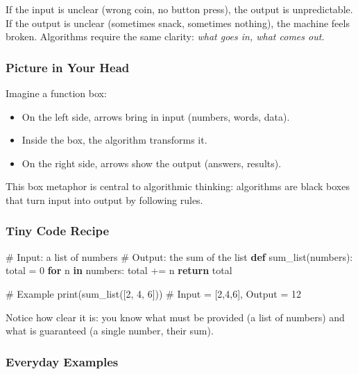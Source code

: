 \documentclass[
  letterpaper,
  DIV=11,
  numbers=noendperiod]{scrreprt}
\newenvironment{Shaded}{\begin{snugshade}}{\end{snugshade}}
\newcommand{\BuiltInTok}[1]{\textcolor[rgb]{0.00,0.23,0.31}{#1}}
\newcommand{\CommentTok}[1]{\textcolor[rgb]{0.37,0.37,0.37}{#1}}
\newcommand{\ControlFlowTok}[1]{\textcolor[rgb]{0.00,0.23,0.31}{\textbf{#1}}}
\newcommand{\DecValTok}[1]{\textcolor[rgb]{0.68,0.00,0.00}{#1}}
\newcommand{\KeywordTok}[1]{\textcolor[rgb]{0.00,0.23,0.31}{\textbf{#1}}}
\newcommand{\NormalTok}[1]{\textcolor[rgb]{0.00,0.23,0.31}{#1}}
\newcommand{\OperatorTok}[1]{\textcolor[rgb]{0.37,0.37,0.37}{#1}}
\providecommand{\tightlist}{%
  \setlength{\itemsep}{0pt}\setlength{\parskip}{0pt}}
\begin{document}
If the input is unclear (wrong coin, no button press), the output is
unpredictable. If the output is unclear (sometimes snack, sometimes
nothing), the machine feels broken. Algorithms require the same clarity:
\emph{what goes in, what comes out.}

\subsubsection{Picture in Your Head}\label{picture-in-your-head-10}

Imagine a function box:

\begin{itemize}
\tightlist
\item
  On the left side, arrows bring in input (numbers, words, data).
\item
  Inside the box, the algorithm transforms it.
\item
  On the right side, arrows show the output (answers, results).
\end{itemize}

This box metaphor is central to algorithmic thinking: algorithms are
black boxes that turn input into output by following rules.

\subsubsection{Tiny Code Recipe}\label{tiny-code-recipe-9}

\begin{Shaded}
\begin{Highlighting}[]
\CommentTok{\# Input: a list of numbers}
\CommentTok{\# Output: the sum of the list}
\KeywordTok{def}\NormalTok{ sum\_list(numbers):}
\NormalTok{    total }\OperatorTok{=} \DecValTok{0}
    \ControlFlowTok{for}\NormalTok{ n }\KeywordTok{in}\NormalTok{ numbers:}
\NormalTok{        total }\OperatorTok{+=}\NormalTok{ n}
    \ControlFlowTok{return}\NormalTok{ total}

\CommentTok{\# Example}
\BuiltInTok{print}\NormalTok{(sum\_list([}\DecValTok{2}\NormalTok{, }\DecValTok{4}\NormalTok{, }\DecValTok{6}\NormalTok{]))  }\CommentTok{\# Input = [2,4,6], Output = 12}
\end{Highlighting}
\end{Shaded}

Notice how clear it is: you know what must be provided (a list of
numbers) and what is guaranteed (a single number, their sum).

\subsubsection{Everyday Examples}\label{everyday-examples-9}
\end{document}

